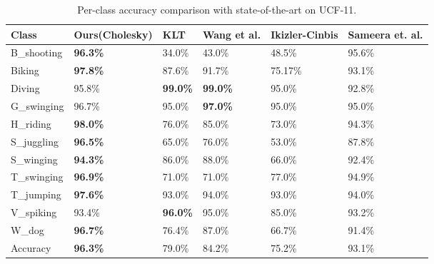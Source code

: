 \begin{table*}[]
\centering
\caption{Per-class accuracy comparison with state-of-the-art on UCF-11.}\label{tbl:per-action ucf}
\begin{tabular}{|l||l|l|l|l|l|}
\hline
Class            & Ours(Cholesky) & KLT\cite{lucas1981iterative} & Wang et al.\cite{wang2011action} & Ikizler-Cinbis\cite{ikizler2010object} & Sameera et. al.\cite{7486474} \\ \hline  \hline
B\_shooting       & \textbf{96.3\%}    &  34.0\%   &  43.0\%   & 48.5\%    &   95.6\%  \\
Biking           & \textbf{97.8\%}    &  87.6\%   &  91.7\%   & 75.17\%    &  93.1\%   \\
Diving           & 95.8\%    &  \textbf{99.0\%}   &  \textbf{99.0\%}   & 95.0\%    &   92.8\%  \\
G\_swinging       & 96.7\%    &  95.0\%   &  \textbf{97.0\%}   & 95.0\%    &   95.0\%  \\
H\_riding         & \textbf{98.0\%}    &  76.0\%   &  85.0\%   & 73.0\%    &   94.3\%  \\
S\_juggling       & \textbf{96.5\%}    &  65.0\%   &  76.0\%   & 53.0\%    &   87.8\%  \\
S\_winging         & \textbf{94.3\%}    &  86.0\%   &  88.0\%   & 66.0\%    &   92.4\%  \\
T\_swinging       & \textbf{96.9\%}    &  71.0\%   &  71.0\%   & 77.0\%    &   94.9\%  \\
T\_jumping        & \textbf{97.6\%}    &  93.0\%   &  94.0\%   & 93.0\%    &   94.0\%  \\
V\_spiking        & 93.4\%    &  \textbf{96.0\%}   &  95.0\%   & 85.0\%    &   93.2\%  \\
W\_dog            & \textbf{96.7\%}    &  76.4\%   &  87.0\%   & 66.7\%    &   91.4\%  \\ \hline \hline
Accuracy &  \textbf{96.3\%}   &  79.0\%   &  84.2\%   & 75.2\%    &   93.1\%  \\ \hline
\end{tabular}
\end{table*}

